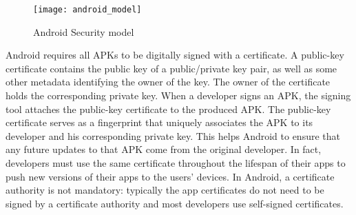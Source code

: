 \begin{figure}[H]
\centering
\texttt{[image: android\_model]}
\caption{Android Security model}
\label{fig:androidmodel}
\end{figure}

Android requires  all APKs to be digitally signed with a certificate. A public-key certificate contains the public key of a public/private key pair, as well as some other metadata identifying the owner of the key. The owner of the certificate holds the corresponding private key. When a developer signs an APK, the signing tool attaches the public-key certificate to the produced APK. The public-key certificate serves as a fingerprint that uniquely associates the APK to its developer and his corresponding private key. This helps Android to ensure that any future updates to that APK  come from the original developer. In fact, developers must use the same certificate throughout the lifespan of their apps to push new versions of their apps to the users' devices. In Android, a certificate authority is not mandatory: typically the app certificates do not need to be signed by a certificate authority and most developers use self-signed certificates.



